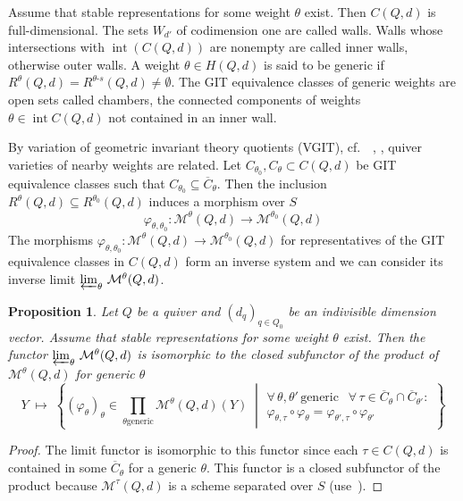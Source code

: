 \documentclass[10pt,a4paper]{amsart}
\newcommand{\cf}{cf.\ }
\newtheorem{prop}[theo]{Proposition}
\theoremstyle{definition}
\def\phi{\varphi}
\DeclareMathOperator{\interior}{int}
\begin{document}

Assume that stable representations for some weight $\theta$ exist. Then $C(Q,d)$ is 
full-dimensional. The sets $W_{d'}$ of codimension one are called walls. 
Walls whose intersections with $\interior(C(Q,d))$ are nonempty are called inner walls, 
otherwise outer walls. A weight $\theta\in H(Q,d)$ is said to be generic if 
$R^\theta(Q,d)=R^{\theta\text{-}s}(Q,d)\neq\emptyset$. The GIT equivalence classes 
of generic weights are open sets called chambers, the connected components of weights
$\theta\in\interior C(Q,d)$ not contained in an inner wall. 


By variation of geometric invariant theory quotients (VGIT), \cf~\cite{Th96}, 
\cite{DH98}, quiver varieties of nearby weights are related. 
Let $C_{\theta_0},C_\theta\subset C(Q,d)$ be GIT equivalence 
classes such that $C_{\theta_0}\subseteq\overline{C}_\theta$.
Then the inclusion $R^\theta(Q,d)\subseteq R^{\theta_0}(Q,d)$
induces a morphism over $S$
\[\phi_{\theta,\theta_0}\colon\mathcal M^\theta(Q,d)\to\mathcal M^{\theta_0}(Q,d)\] 
The morphisms 
$\phi_{\theta,\theta_0}\colon\mathcal M^\theta(Q,d)\to\mathcal M^{\theta_0}(Q,d)$
for representatives of the GIT equivalence classes in $C(Q,d)$
form an inverse system and we can consider its inverse limit 
$\varprojlim_\theta\,\mathcal M^\theta(Q,d)$. 

\begin{prop}\label{prop:functorinvlim}
Let $Q$ be a quiver and $(d_q)_{q\in Q_0}$ be an indivisible dimension vector. 
Assume that stable representations for some weight $\theta$ exist. 
Then the functor $\varprojlim_\theta\,\mathcal M^\theta(Q,d)$ is isomorphic to the 
closed subfunctor of the product of $\mathcal M^\theta(Q,d)$ for generic $\theta$
\begin{equation}\label{eq:functorinvlim}
Y\;\mapsto\;
\left\{\left.
(\phi_\theta)_\theta\in\!\!\prod_{\theta \text{generic}}\!\!\!
\mathcal M^\theta(Q,d)(Y)
\;\;\right|\;
\begin{array}{l}
\forall\,\theta,\theta'\,\text{generic}\;\;\:
\forall\,\tau\in\overline{C}_\theta\cap\overline{C}_{\theta'}\colon\\
\phi_{\theta,\tau}\circ\phi_\theta=\phi_{\theta',\tau}\circ\phi_{\theta'}
\end{array}
\right\}
\end{equation}
\end{prop}
\begin{proof}
The limit functor is isomorphic to this functor since each $\tau\in C(Q,d)$ 
is contained in some $\overline{C}_\theta$ for a generic $\theta$.
This functor is a closed subfunctor of the product because $\mathcal M^\tau(Q,d)$
is a scheme separated over $S$ (use~\cite[(5.2.5)]{EGA1}).
\end{proof}
\end{document}
